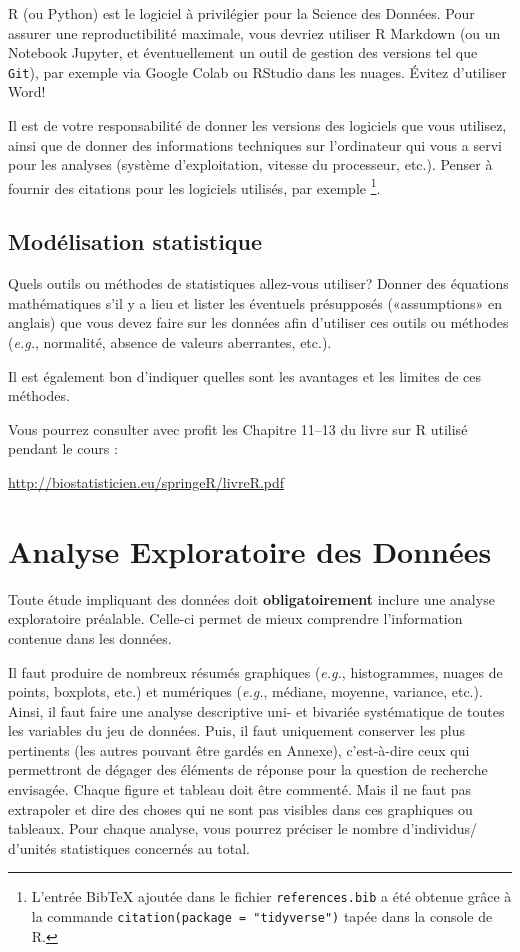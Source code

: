\documentclass[mstat,12pt]{unswthesis}
\begin{document}
\medskip

R (ou Python) est le logiciel à privilégier pour la Science des Données.
Pour assurer une reproductibilité maximale, vous devriez utiliser R
Markdown (ou un Notebook Jupyter, et éventuellement un outil de gestion
des versions tel que \texttt{Git}), par exemple via Google Colab ou
RStudio dans les nuages. Évitez d'utiliser Word!

\bigskip

Il est de votre responsabilité de donner les versions des logiciels que
vous utilisez, ainsi que de donner des informations techniques sur
l'ordinateur qui vous a servi pour les analyses (système d'exploitation,
vitesse du processeur, etc.). Penser à fournir des citations pour les
logiciels utilisés, par exemple
\footnote{L'entrée BibTeX ajoutée dans le fichier \texttt{references.bib} a été obtenue grâce à la commande  \texttt{citation(package = "tidyverse")} tapée dans la console de R.}.

\section{Modélisation statistique}\label{moduxe9lisation-statistique}

Quels outils ou méthodes de statistiques allez-vous utiliser? Donner des
équations mathématiques s'il y a lieu et lister les éventuels
présupposés («assumptions» en anglais) que vous devez faire sur les
données afin d'utiliser ces outils ou méthodes (\emph{e.g.}, normalité,
absence de valeurs aberrantes, etc.).

Il est également bon d'indiquer quelles sont les avantages et les
limites de ces méthodes.

Vous pourrez consulter avec profit les Chapitre 11--13 du livre sur R
utilisé pendant le cours :

\url{http://biostatisticien.eu/springeR/livreR.pdf}

\chapter{Analyse Exploratoire des
Données}\label{analyse-exploratoire-des-donnuxe9es}

Toute étude impliquant des données doit \textbf{obligatoirement} inclure
une analyse exploratoire préalable. Celle-ci permet de mieux comprendre
l'information contenue dans les données.

Il faut produire de nombreux résumés graphiques (\emph{e.g.},
histogrammes, nuages de points, boxplots, etc.) et numériques
(\emph{e.g.}, médiane, moyenne, variance, etc.). Ainsi, il faut faire
une analyse descriptive uni- et bivariée systématique de toutes les
variables du jeu de données. Puis, il faut uniquement conserver les plus
pertinents (les autres pouvant être gardés en Annexe), c'est-à-dire ceux
qui permettront de dégager des éléments de réponse pour la question de
recherche envisagée. Chaque figure et tableau doit être commenté. Mais
il ne faut pas extrapoler et dire des choses qui ne sont pas visibles
dans ces graphiques ou tableaux. Pour chaque analyse, vous pourrez
préciser le nombre d'individus/ d'unités statistiques concernés au
total.
\end{document}
